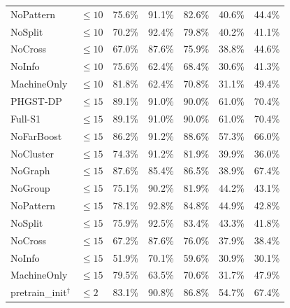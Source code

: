 \begin{table}[p]
\begin{tabularx}{\textwidth}{@{}lXXXXXX@{}}
NoPattern & $\le 10$ & 75.6\% & 91.1\% & 82.6\% & 40.6\% & 44.4\% \\
NoSplit & $\le 10$ & 70.2\% & 92.4\% & 79.8\% & 40.2\% & 41.1\% \\
NoCross & $\le 10$ & 67.0\% & 87.6\% & 75.9\% & 38.8\% & 44.6\% \\
NoInfo & $\le 10$ & 75.6\% & 62.4\% & 68.4\% & 30.6\% & 41.3\% \\
MachineOnly & $\le 10$ & 81.8\% & 62.4\% & 70.8\% & 31.1\% & 49.4\% \\
\midrule
PHGST-DP & $\le 15$ & 89.1\% & 91.0\% & 90.0\% & 61.0\% & 70.4\% \\
Full-S1 & $\le 15$ & 89.1\% & 91.0\% & 90.0\% & 61.0\% & 70.4\% \\
NoFarBoost & $\le 15$ & 86.2\% & 91.2\% & 88.6\% & 57.3\% & 66.0\% \\
NoCluster & $\le 15$ & 74.3\% & 91.2\% & 81.9\% & 39.9\% & 36.0\% \\
NoGraph & $\le 15$ & 87.6\% & 85.4\% & 86.5\% & 38.9\% & 67.4\% \\
NoGroup & $\le 15$ & 75.1\% & 90.2\% & 81.9\% & 44.2\% & 43.1\% \\
NoPattern & $\le 15$ & 78.1\% & 92.8\% & 84.8\% & 44.9\% & 42.8\% \\
NoSplit & $\le 15$ & 75.9\% & 92.5\% & 83.4\% & 43.3\% & 41.8\% \\
NoCross & $\le 15$ & 67.2\% & 87.6\% & 76.0\% & 37.9\% & 38.4\% \\
NoInfo & $\le 15$ & 51.9\% & 70.1\% & 59.6\% & 30.9\% & 30.1\% \\
MachineOnly & $\le 15$ & 79.5\% & 63.5\% & 70.6\% & 31.7\% & 47.9\% \\
\midrule
pretrain\_init$^\dagger$ & $\le 2$ & 83.1\% & 90.8\% & 86.8\% & 54.7\% & 67.4\% \\
\bottomrule
\end{tabularx}
\end{table}

